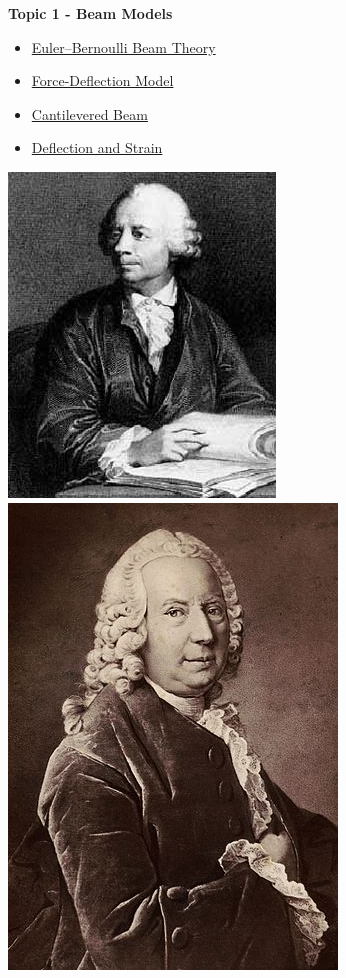 \documentclass[fleqn]{beamer} %
\newcommand{\sectionItitle}{Beam Models}
\newcommand{\sectionIsubsectionItitle}{Euler–Bernoulli Beam Theory}
\newcommand{\sectionIsubsectionIItitle}{Force-Deflection Model}
\newcommand{\sectionIsubsectionIIItitle}{Cantilevered Beam}
\newcommand{\sectionIsubsectionIVtitle}{Deflection and Strain}
\begin{document}
		\begin{frame} 
			\large \textbf{Topic 1 - \sectionItitle} \vspace{3mm}\\

			\begin{multicols}{2}
			\begin{itemize}
				\item \hyperlink{sectionIsubsectionI}{\sectionIsubsectionItitle} \vspc %
				\item \hyperlink{sectionIsubsectionII}{\sectionIsubsectionIItitle} \vspc %
				\item \hyperlink{sectionIsubsectionIII}{\sectionIsubsectionIIItitle} \vspc %
				\item \hyperlink{sectionIsubsectionIV}{\sectionIsubsectionIVtitle} \vspc %
			\end{itemize}

			\includegraphics[scale=0.28]{images/leonhard_euler.jpg}
			\includegraphics[scale=1.7]{images/daniel_bernoulli.jpg}

			\end{multicols}
		\end{frame}
		
\end{document}
